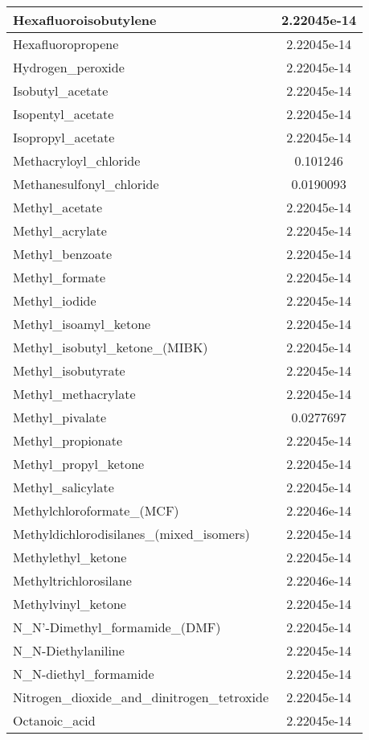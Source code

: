 \begin{longtable}{|l|c|}
Hexafluoroisobutylene 	& 2.22045e-14\\ \hline
Hexafluoropropene 	& 2.22045e-14\\ \hline
Hydrogen\_peroxide 	& 2.22045e-14\\ \hline
Isobutyl\_acetate 	& 2.22045e-14\\ \hline
Isopentyl\_acetate 	& 2.22045e-14\\ \hline
Isopropyl\_acetate 	& 2.22045e-14\\ \hline
Methacryloyl\_chloride 	& 0.101246\\ \hline
Methanesulfonyl\_chloride 	& 0.0190093\\ \hline
Methyl\_acetate 	& 2.22045e-14\\ \hline
Methyl\_acrylate 	& 2.22045e-14\\ \hline
Methyl\_benzoate 	& 2.22045e-14\\ \hline
Methyl\_formate 	& 2.22045e-14\\ \hline
Methyl\_iodide 	& 2.22045e-14\\ \hline
Methyl\_isoamyl\_ketone 	& 2.22045e-14\\ \hline
Methyl\_isobutyl\_ketone\_(MIBK) 	& 2.22045e-14\\ \hline
Methyl\_isobutyrate 	& 2.22045e-14\\ \hline
Methyl\_methacrylate 	& 2.22045e-14\\ \hline
Methyl\_pivalate 	& 0.0277697\\ \hline
Methyl\_propionate 	& 2.22045e-14\\ \hline
Methyl\_propyl\_ketone 	& 2.22045e-14\\ \hline
Methyl\_salicylate 	& 2.22045e-14\\ \hline
Methylchloroformate\_(MCF) 	& 2.22046e-14\\ \hline
Methyldichlorodisilanes\_(mixed\_isomers) 	& 2.22045e-14\\ \hline
Methylethyl\_ketone 	& 2.22045e-14\\ \hline
Methyltrichlorosilane 	& 2.22046e-14\\ \hline
Methylvinyl\_ketone 	& 2.22045e-14\\ \hline
N\_N'-Dimethyl\_formamide\_(DMF) 	& 2.22045e-14\\ \hline
N\_N-Diethylaniline 	& 2.22045e-14\\ \hline
N\_N-diethyl\_formamide 	& 2.22045e-14\\ \hline
Nitrogen\_dioxide\_and\_dinitrogen\_tetroxide 	& 2.22045e-14\\ \hline
Octanoic\_acid 	& 2.22045e-14\\ \hline

\end{longtable}
